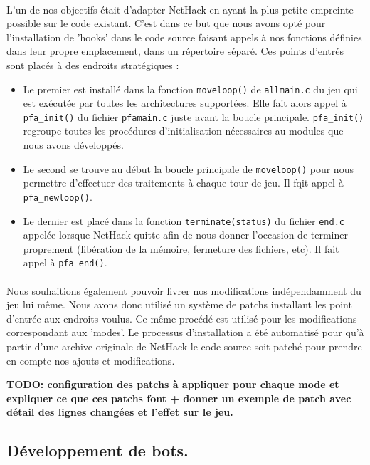 \documentclass[a4paper,12pt]{article}
\begin{document}
\paragraph{} L'un de nos objectifs était d'adapter NetHack en ayant la plus petite empreinte possible sur le code existant. C'est dans ce but que nous avons opté pour l'installation de 'hooks' dans le code source faisant appels à nos fonctions définies dans leur propre emplacement, dans un répertoire séparé. Ces points d'entrés sont placés à des endroits stratégiques :
\begin{itemize}
	\item Le premier est installé dans la fonction \verb!moveloop()! de \verb!allmain.c! du jeu qui est exécutée par toutes les architectures supportées. Elle fait alors appel à \verb!pfa_init()! du fichier \verb!pfamain.c! juste avant la boucle principale. \verb!pfa_init()! regroupe toutes les procédures d'initialisation nécessaires au modules que nous avons développés.
	\item Le second se trouve au début la boucle principale de \verb!moveloop()! pour nous permettre d'effectuer des traitements à chaque tour de jeu. Il fqit appel à \verb!pfa_newloop()!.
	\item Le dernier est placé dans la fonction \verb!terminate(status)! du fichier \verb!end.c! appelée lorsque NetHack quitte afin de nous donner l'occasion de terminer proprement (libération de la mémoire, fermeture des fichiers, etc). Il fait appel à \verb!pfa_end()!.
\end{itemize}

\paragraph{} Nous souhaitions également pouvoir livrer nos modifications indépendamment du jeu lui même. Nous avons donc utilisé un système de patchs installant les point d'entrée aux endroits voulus. Ce même procédé est utilisé pour les modifications correspondant aux 'modes'. Le processus d'installation a été automatisé pour qu'à partir d'une archive originale de NetHack le code source soit patché pour prendre en compte nos ajouts et modifications.

\textbf{
TODO: configuration des patchs à appliquer pour chaque mode et expliquer ce que ces patchs font + donner un exemple de patch avec détail des lignes changées et l'effet sur le jeu.}


\subsection{Développement de bots.}
\end{document}

